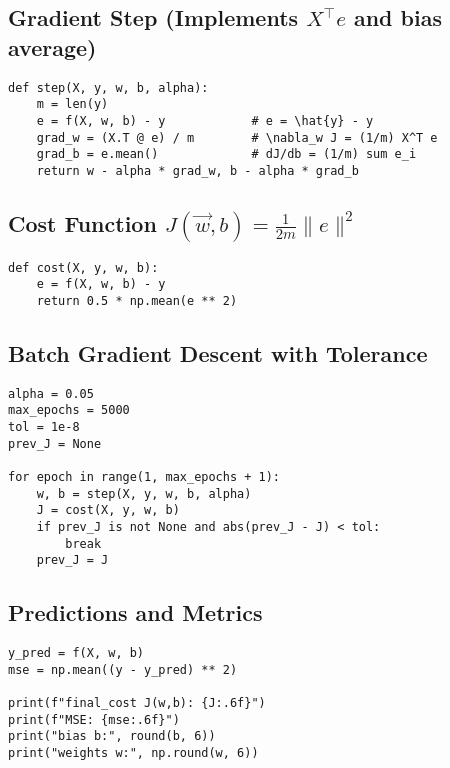 \documentclass[12pt]{article}
\begin{document}
\subsection*{Gradient Step (Implements \(X^\top e\) and bias average)}
\begin{lstlisting}
def step(X, y, w, b, alpha):
    m = len(y)
    e = f(X, w, b) - y            # e = \hat{y} - y
    grad_w = (X.T @ e) / m        # \nabla_w J = (1/m) X^T e
    grad_b = e.mean()             # dJ/db = (1/m) sum e_i
    return w - alpha * grad_w, b - alpha * grad_b
\end{lstlisting}

\subsection*{Cost Function \(J(\vec w,b)=\tfrac{1}{2m}\|e\|^2\)}
\begin{lstlisting}
def cost(X, y, w, b):
    e = f(X, w, b) - y
    return 0.5 * np.mean(e ** 2)
\end{lstlisting}

\subsection*{Batch Gradient Descent with Tolerance}
\begin{lstlisting}
alpha = 0.05
max_epochs = 5000
tol = 1e-8
prev_J = None

for epoch in range(1, max_epochs + 1):
    w, b = step(X, y, w, b, alpha)
    J = cost(X, y, w, b)
    if prev_J is not None and abs(prev_J - J) < tol:
        break
    prev_J = J
\end{lstlisting}

\subsection*{Predictions and Metrics}
\begin{lstlisting}
y_pred = f(X, w, b)
mse = np.mean((y - y_pred) ** 2)

print(f"final_cost J(w,b): {J:.6f}")
print(f"MSE: {mse:.6f}")
print("bias b:", round(b, 6))
print("weights w:", np.round(w, 6))
\end{lstlisting}
\end{document}
